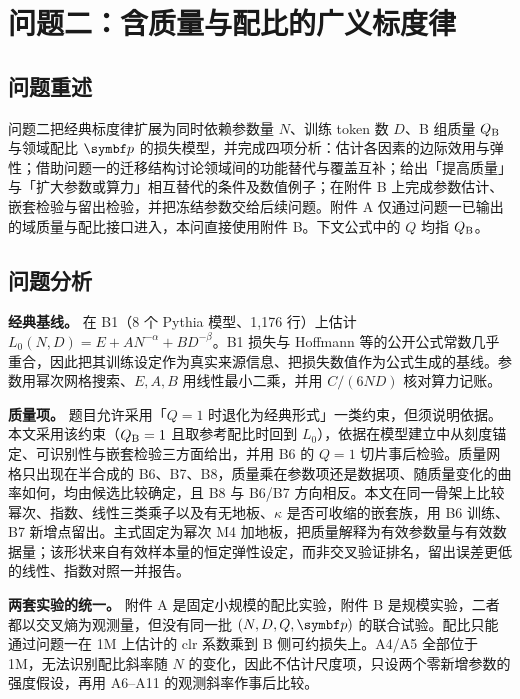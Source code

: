 \section{问题二：含质量与配比的广义标度律}
\label{sec:5.3}

\subsection{问题重述}
\label{sec:5.3.1}

问题二把经典标度律扩展为同时依赖参数量 $N$、训练 token 数 $D$、B 组质量 $Q_{\rm B}$ 与领域配比 $\bp$ 的损失模型，并完成四项分析：估计各因素的边际效用与弹性；借助问题一的迁移结构讨论领域间的功能替代与覆盖互补；给出「提高质量」与「扩大参数或算力」相互替代的条件及数值例子；在附件 B 上完成参数估计、嵌套检验与留出检验，并把冻结参数交给后续问题。附件 A 仅通过问题一已输出的域质量与配比接口进入，本问直接使用附件 B。下文公式中的 $Q$ 均指 $Q_{\rm B}$。

\subsection{问题分析}
\label{sec:5.3.2}

\textbf{经典基线。} 在 B1（8 个 Pythia 模型、1,176 行）上估计 $L_0(N,D)=E+AN^{-\alpha}+BD^{-\beta}$\cite{pythia}。B1 损失与 Hoffmann 等\cite{hoffmann}的公开公式常数几乎重合，因此把其训练设定作为真实来源信息、把损失数值作为公式生成的基线。参数用幂次网格搜索、$E,A,B$ 用线性最小二乘，并用 $C/(6ND)$ 核对算力记账。

\textbf{质量项。} 题目允许采用「$Q=1$ 时退化为经典形式」一类约束，但须说明依据。本文采用该约束（$Q_{\rm B}=1$ 且取参考配比时回到 $L_0$），依据在模型建立中从刻度锚定、可识别性与嵌套检验三方面给出，并用 B6 的 $Q=1$ 切片事后检验。质量网格只出现在半合成的 B6、B7、B8，质量乘在参数项还是数据项、随质量变化的曲率如何，均由候选比较确定，且 B8 与 B6/B7 方向相反。本文在同一骨架上比较幂次、指数、线性三类乘子以及有无地板、$\kappa$ 是否可收缩的嵌套族，用 B6 训练、B7 新增点留出。主式固定为幂次 M4 加地板，把质量解释为有效参数量与有效数据量；该形状来自有效样本量的恒定弹性设定\cite{subramanyam}，而非交叉验证排名，留出误差更低的线性、指数对照一并报告。

\textbf{两套实验的统一。} 附件 A 是固定小规模的配比实验，附件 B 是规模实验，二者都以交叉熵为观测量，但没有同一批 $(N,D,Q,\bp)$ 的联合试验。配比只能通过问题一在 1M 上估计的 clr 系数乘到 B 侧可约损失上。A4/A5 全部位于 1M，无法识别配比斜率随 $N$ 的变化，因此不估计尺度项，只设两个零新增参数的强度假设，再用 A6–A11 的观测斜率作事后比较。

